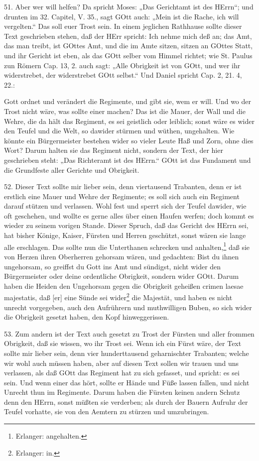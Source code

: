 51. Aber wer will helfen? Da spricht Moses: „Das Gerichtamt ist des HErrn“; und drunten im 32. Capitel, V. 35., sagt GOtt auch: „Mein ist die Rache, ich will vergelten.“ Das soll euer Trost sein. In einem jeglichen Rathhause sollte dieser Text geschrieben stehen, daß der HErr spricht: Ich nehme mich deß an; das Amt, das man treibt, ist GOttes Amt, und die im Amte sitzen, sitzen an GOttes Statt, und ihr Gericht ist eben, als das GOtt selber vom Himmel richtet; wie St. Paulus zun Römern Cap. 13, 2. auch sagt: „Alle Obrigkeit ist von GOtt, und wer ihr widerstrebet, der widerstrebet GOtt selbst.“ Und Daniel spricht Cap. 2, 21. 4, 22.:

Gott ordnet und verändert die Regimente, und gibt sie, wem er will. Und wo der Trost nicht wäre, was sollte einer machen? Das ist die Mauer, der Wall und die Wehre, die da hält das Regiment, es sei geistlich oder leiblich; sonst wäre es wider den Teufel und die Welt, so dawider stürmen und wüthen, ungehalten. Wie könnte ein Bürgermeister bestehen wider so vieler Leute Haß und Zorn, ohne dies Wort? Darum halten sie das Regiment nicht, sondern der Text, der hier geschrieben steht: „Das Richteramt ist des HErrn.“ GOtt ist das Fundament und die Grundfeste aller Gerichte und Obrigkeit.

52. Dieser Text sollte mir lieber sein, denn viertausend Trabanten, denn er ist erstlich eine Mauer und Wehre der Regimente; es soll sich auch ein Regiment darauf stützen und verlassen. Wohl fest und sperrt sich der Teufel dawider, wie oft geschehen, und wollte es gerne alles über einen Haufen werfen; doch kommt es wieder zu seinem vorigen Stande. Dieser Spruch, daß das Gericht des HErrn sei, hat bisher Könige, Kaiser, Fürsten und Herren geschützt, sonst wären sie lange alle erschlagen. Das sollte nun die Unterthanen schrecken und anhalten,\footnote{Erlanger: angehalten.} daß sie von Herzen ihren Oberherren gehorsam wären, und gedachten: Bist du ihnen ungehorsam, so greiffst du Gott ins Amt und sündigst, nicht wider den Bürgermeister oder deine ordentliche Obrigkeit, sondern wider GOtt. Darum haben die Heiden den Ungehorsam gegen die Obrigkeit geheißen crimen laesae majestatis, daß [er] eine Sünde sei wider\footnote{Erlanger: in.} die Majestät, und haben es nicht unrecht vorgegeben, auch den Aufrührern und muthwilligen Buben, so sich wider die Obrigkeit gesetzt haben, den Kopf hinweggerissen.

53. Zum andern ist der Text auch gesetzt zu Trost der Fürsten und aller frommen Obrigkeit, daß sie wissen, wo ihr Trost sei. Wenn ich ein Fürst wäre, der Text sollte mir lieber sein, denn vier hunderttausend geharnischter Trabanten; welche wir wohl auch müssen haben, aber auf diesen Text sollen wir trauen und uns verlassen, als daß GOtt das Regiment hat zu sich gefasset, und spricht: es sei sein. Und wenn einer das hört, sollte er Hände und Füße lassen fallen, und nicht Unrecht thun im Regimente. Darum haben die Fürsten keinen andern Schutz denn den HErrn, sonst müßten sie verderben; als durch der Bauern Aufruhr der Teufel vorhatte, sie von den Aemtern zu stürzen und umzubringen.


